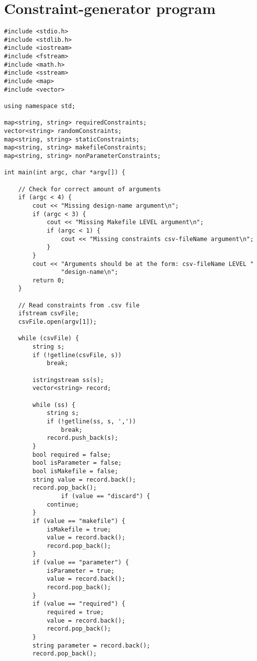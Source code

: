 \section{\label{sec:constraintgeneratorsourcecode}Constraint-generator program}
\lstset{language=C++, style=Cstyle}
\begin{lstlisting}[caption={Constraint-generation program source code},label=lst:constraintGenerating]
#include <stdio.h>
#include <stdlib.h>
#include <iostream>
#include <fstream>
#include <math.h>
#include <sstream>
#include <map>
#include <vector>

using namespace std;

map<string, string> requiredConstraints;
vector<string> randomConstraints;
map<string, string> staticConstraints;
map<string, string> makefileConstraints;
map<string, string> nonParameterConstraints;

int main(int argc, char *argv[]) {

    // Check for correct amount of arguments
    if (argc < 4) {
        cout << "Missing design-name argument\n";
        if (argc < 3) {
            cout << "Missing Makefile LEVEL argument\n";
            if (argc < 1) {
                cout << "Missing constraints csv-fileName argument\n";
            }
        }
        cout << "Arguments should be at the form: csv-fileName LEVEL "
                "design-name\n";
        return 0;
    }

    // Read constraints from .csv file
    ifstream csvFile;
    csvFile.open(argv[1]);

    while (csvFile) {
        string s;
        if (!getline(csvFile, s))
            break;

        istringstream ss(s);
        vector<string> record;

        while (ss) {
            string s;
            if (!getline(ss, s, ','))
                break;
            record.push_back(s);
        }
        bool required = false;
        bool isParameter = false;
        bool isMakefile = false;
        string value = record.back();
        record.pop_back();
				if (value == "discard") {
            continue;
        }
        if (value == "makefile") {
            isMakefile = true;
            value = record.back();
            record.pop_back();
        }
        if (value == "parameter") {
            isParameter = true;
            value = record.back();
            record.pop_back();
        }
        if (value == "required") {
            required = true;
            value = record.back();
            record.pop_back();
        }
        string parameter = record.back();
        record.pop_back();


\end{lstlisting}
